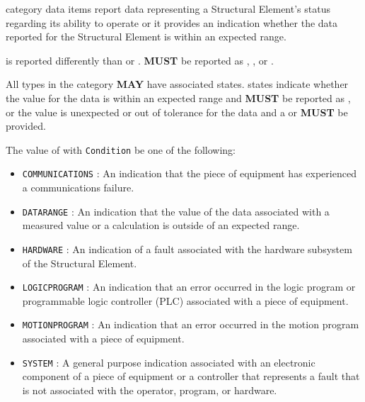  category data items report data representing a \gls{Structural Element}’s status regarding its ability to operate or it provides an indication whether the data reported for the \gls{Structural Element} is within an expected range.

 is reported differently than  or .   \textbf{MUST} be reported as , , or .

All  types in the  category \textbf{MAY} have associated  states.   states indicate whether the value for the data is within an expected range and \textbf{MUST} be reported as , or the value is unexpected or out of tolerance for the data and a  or  \textbf{MUST} be provided.


The value of  with  \texttt{Condition} \MUST be one of the following:
\begin{itemize}

\item \texttt{COMMUNICATIONS} : An indication that the piece of equipment has experienced a communications failure. 

\item \texttt{DATA\textunderscore RANGE} : An indication that the value of the data associated with a measured value or a calculation is outside of an expected range. 

\item \texttt{HARDWARE} : An indication of a fault associated with the hardware subsystem of the \gls{Structural Element}. 

\item \texttt{LOGIC\textunderscore PROGRAM} : An indication that an error occurred in the logic program or programmable logic controller (PLC) associated with a piece of equipment. 

\item \texttt{MOTION\textunderscore PROGRAM} : An indication that an error occurred in the motion program associated with a piece of equipment. 

\item \texttt{SYSTEM} : A general purpose indication associated with an electronic component of a piece of equipment or a controller that represents a fault that is not associated with the operator, program, or hardware. 

\end{itemize}

